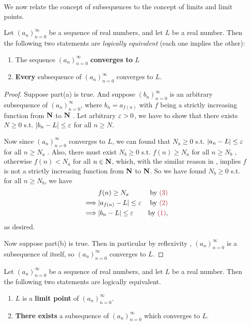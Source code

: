 We now relate the concept of subsequences to the concept of limits and limit points.
\begin{proposition}  \label{prop 6.6.5}
Let \((a_n)_{n = 0}^{\infty}\) be a sequence of real numbers, and let \(L\) be a real number.
Then the following two statements are \emph{logically equivalent} (each one implies the other):
\begin{enumerate}
    \item The sequence \((a_n)_{n = 0}^{\infty}\) \textbf{converges to} \(L\)
    \item \textbf{Every} subsequence of \((a_n)_{n = 0}^{\infty}\) converges to \(L\).
\end{enumerate}
\end{proposition}

\begin{proof}
Suppose part(a) is true.
And suppose \((b_n)_{n = 0}^{\infty}\) is an arbitrary subsequence of \((a_n)_{n = 0}^{\infty}\), where \(b_n = a_{f(n)}\) with \(f\) being a strictly increasing function from \(\mathbf{N}\) to \(\mathbf{N}\) .
Let arbitrary \(\varepsilon > 0\), we have to show that there exists \(N \ge 0\) s.t. \(\lvert b_n - L\rvert \le \varepsilon\) for all \(n \ge N\).

Now since \((a_n)_{n = 0}^{\infty}\) converges to \(L\), we can found that \(N_a \ge 0\) s.t. \(\lvert a_n - L\rvert \le \varepsilon\) for all \(n \ge N_a\) .
Also, there must exist \(N_b \ge 0\) s.t. \(f(n) \ge N_a\) for all \(n \ge N_b\) , otherwise \(f(n) < N_a\) for all \(n \in \mathbf{N}\), which, with the similar reason in , implies \(f\) is not a strictly increasing function from \(\mathbf{N}\) to \(\mathbf{N}\).
So we have found \(N_b \ge 0\) s.t. for all \(n \ge N_b\), we have
\begin{align*}
             & f(n) \ge N_a & \text{by \MAROON{(3)}} \\
    \implies & \abs{a_{f(n)} - L} \le \varE & \text{by \MAROON{(2)}} \\
    \implies & \abs{b_n - L} \le \varE & \text{by \MAROON{(1)}},
\end{align*}
as desired.

Now suppose part(b) is true.
Then in particular by reflexivity , \((a_n)_{n = 0}^{\infty}\) is a subsequence of itself, so \((a_n)_{n = 0}^{\infty}\) converges to \(L\).
\end{proof}

\begin{proposition}   \label{prop 6.6.6}
Let \((a_n)_{n = 0}^{\infty}\) be a sequence of real numbers, and let \(L\) be a real number.
Then the following two statements are logically equivalent.
\begin{enumerate}
    \item \(L\) is a \textbf{limit point} of \((a_n)_{n = 0}^{\infty}\).
    \item \textbf{There exists} a subsequence of \((a_n)_{n = 0}^{\infty}\) which converges to \(L\).
\end{enumerate}
\end{proposition}


